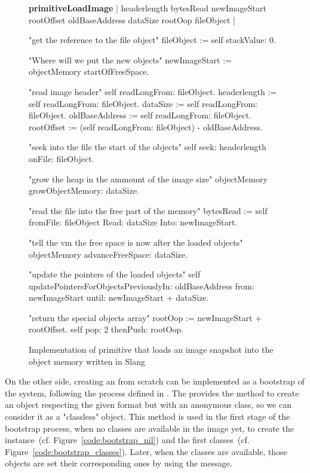 \begin{figure}[htb]
\begin{code}
\textbf{primitiveLoadImage}
    | headerlength bytesRead newImageStart rootOffset oldBaseAddress dataSize rootOop fileObject |
    
    "get the reference to the file object"
    fileObject := self stackValue: 0.

    "Where will we put the new objects"
    newImageStart := objectMemory startOfFreeSpace.

    "read image header"
    self readLongFrom: fileObject.
    headerlength := self readLongFrom: fileObject.
    dataSize := self readLongFrom: fileObject.
    oldBaseAddress := self readLongFrom: fileObject.
    rootOffset :=
          (self readLongFrom: fileObject) - oldBaseAddress.
    
    "seek into the file the start of the objects"
    self seek: headerlength onFile: fileObject.
    
    "grow the heap in the ammount of the image size"
    objectMemory growObjectMemory: dataSize.
    
    "read the file into the free part of the memory"
    bytesRead := self
                    fromFile: fileObject
                    Read: dataSize
                    Into: newImageStart.

    "tell the vm the free space is now after the loaded objects"
    objectMemory advanceFreeSpace: dataSize.
         
    "update the pointers of the loaded objects"
    self
          updatePointersForObjectsPreviouslyIn: oldBaseAddress
          from: newImageStart
          until: newImageStart + dataSize.
    
    "return the special objects array"
    rootOop := newImageStart + rootOffset.
    self pop: 2 thenPush: rootOop.
\end{code}
\caption{Implementation of primitive \textbf{} that loads an image snapshot into the object memory written in Slang
\label{code:import_image}}
\end{figure}

On the other side, creating an \objectspace from scratch can be implemented as a bootstrap of the system, following the process defined in \cite{Poli12a}. The \objectspace provides the \textbf{} method to create an object respecting the given format but with an anonymous class, so we can consider it as a "classless" object. This method is used in the first stage of the bootstrap process, when no classes are available in the \objectspace image yet, to create the  instance~(cf. Figure~\ref{code:bootstrap_nil}) and the first classes~(cf. Figure~\ref{code:bootstrap_classes}). Later, when the classes are available, those objects are set their corresponding ones by using the \textbf{} message.

